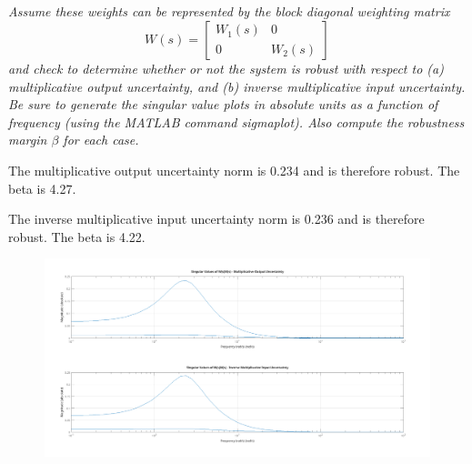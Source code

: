 \documentclass{article}
\begin{document}
\subsection{}
\textit{Assume these weights can be represented by the block diagonal weighting matrix
\[
W(s)=\left[\begin{array}{cc}
W_1(s) & 0 \\
0 & W_2(s)
\end{array}\right]
\]
and check to determine whether or not the system is robust with respect to (a) multiplicative output uncertainty, and (b) inverse multiplicative input uncertainty. Be sure to generate the singular value plots in absolute units as a function of frequency (using the MATLAB command sigmaplot). Also compute the robustness margin $\beta$ for each case.}

The multiplicative output uncertainty norm is 0.234 and is therefore robust.
The beta is 4.27.

The inverse multiplicative input uncertainty norm is 0.236 and is therefore robust.
The beta is 4.22.

\begin{figure}[H]
    \centering
    \includegraphics[width=\textwidth]{weightedUncertaintyPlot.png}
    \label{fig:weightedUncertaintyPlot}
\end{figure}
\end{document}
